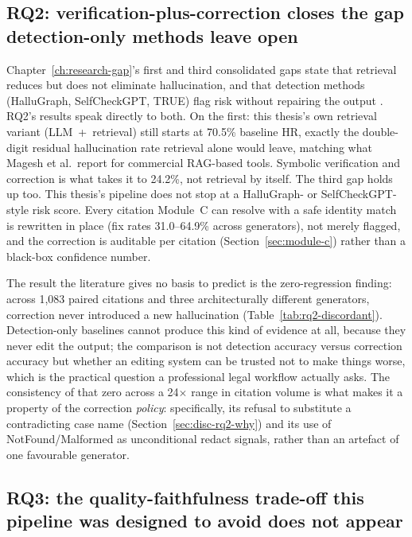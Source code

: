 \subsection{RQ2: verification-plus-correction closes the gap detection-only methods leave open}
\label{sec:disc-rq2}

Chapter~\ref{ch:research-gap}'s first and third consolidated gaps state that retrieval reduces but does not eliminate hallucination, and that detection methods (HalluGraph, SelfCheckGPT, TRUE) flag risk without repairing the output \cite{lewis2020rag,noel2025hallugraph,manakul2023selfcheckgpt,honovich2022true}. RQ2's results speak directly to both. On the first: this thesis's own retrieval variant (LLM~+~retrieval) still starts at 70.5\% baseline HR, exactly the double-digit residual hallucination rate retrieval alone would leave, matching what Magesh et al.\ report for commercial RAG-based tools. Symbolic verification and correction is what takes it to 24.2\%, not retrieval by itself. The third gap holds up too. This thesis's pipeline does not stop at a HalluGraph- or SelfCheckGPT-style risk score. Every citation Module~C can resolve with a safe identity match is rewritten in place (fix rates 31.0--64.9\% across generators), not merely flagged, and the correction is auditable per citation (Section~\ref{sec:module-c}) rather than a black-box confidence number.

The result the literature gives no basis to predict is the zero-regression finding: across 1{,}083 paired citations and three architecturally different generators, correction never introduced a new hallucination (Table~\ref{tab:rq2-discordant}). Detection-only baselines cannot produce this kind of evidence at all, because they never edit the output; the comparison is not detection accuracy versus correction accuracy but whether an editing system can be trusted not to make things worse, which is the practical question a professional legal workflow actually asks. The consistency of that zero across a 24$\times$ range in citation volume is what makes it a property of the correction \emph{policy}: specifically, its refusal to substitute a contradicting case name (Section~\ref{sec:disc-rq2-why}) and its use of NotFound/Malformed as unconditional redact signals, rather than an artefact of one favourable generator.

\subsection{RQ3: the quality-faithfulness trade-off this pipeline was designed to avoid does not appear}
\label{sec:disc-rq3}

